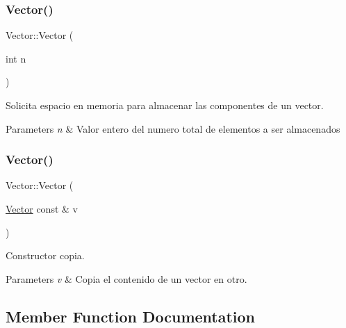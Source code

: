 \subsubsection{\texorpdfstring{Vector()}{Vector()}\hspace{0.1cm}{\footnotesize\ttfamily [1/2]}}
{\footnotesize\ttfamily Vector\+::\+Vector (\begin{DoxyParamCaption}\item[{int}]{n }\end{DoxyParamCaption})\hspace{0.3cm}{\ttfamily [inline]}}



Solicita espacio en memoria para almacenar las componentes de un vector. 


\begin{DoxyParams}{Parameters}
{\em n} & Valor entero del numero total de elementos a ser almacenados \\
\hline
\end{DoxyParams}
\hypertarget{class_vector_af2fe7a700bc95cb634f7dd12c2f11b5e}{}\label{class_vector_af2fe7a700bc95cb634f7dd12c2f11b5e} 
\subsubsection{\texorpdfstring{Vector()}{Vector()}\hspace{0.1cm}{\footnotesize\ttfamily [2/2]}}
{\footnotesize\ttfamily Vector\+::\+Vector (\begin{DoxyParamCaption}\item[{\hyperlink{class_vector}{Vector} const \&}]{v }\end{DoxyParamCaption})\hspace{0.3cm}{\ttfamily [inline]}}



Constructor copia. 


\begin{DoxyParams}{Parameters}
{\em v} & Copia el contenido de un vector en otro. \\
\hline
\end{DoxyParams}


\subsection{Member Function Documentation}
\hypertarget{class_vector_a64d1af82e5f8d82c7a6ca5e309c3bf8f}{}\label{class_vector_a64d1af82e5f8d82c7a6ca5e309c3bf8f} 
